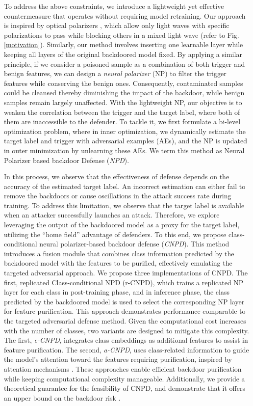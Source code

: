 To address the above constraints, we introduce a lightweight yet effective countermeasure that operates without requiring model retraining. 
Our approach is inspired by optical polarizers \cite{xiong2016optical}, which allow only light waves with specific polarizations to pass while blocking others in a mixed light wave (refer to Fig. \ref{motivation}). 
Similarly, our method involves inserting one learnable layer while keeping all layers of the original backdoored model fixed. By applying a similar principle, if we consider a poisoned sample as a combination of both trigger and benign features, we can design a \textit{neural polarizer} (NP) to filter the trigger features while conserving the benign ones. Consequently, contaminated samples could be cleansed thereby diminishing the impact of the backdoor, while benign samples remain largely unaffected.
With the lightweight NP, our objective is to weaken the correlation between the trigger and the target label, where both of them are inaccessible to the defender. To tackle it, we first formulate a bi-level optimization problem, where in inner optimization, we dynamically estimate the target label and trigger with adversarial examples (AEs), and the NP is updated in outer minimization by unlearning these AEs. We term this method as Neural Polarizer based backdoor Defense (\textit{NPD}).

In this process, we observe that the effectiveness of defense depends on the accuracy of the estimated target label. An incorrect estimation can either fail to remove the backdoors or cause oscillations in the attack success rate during training. To address this limitation, we observe that the target label is available when an attacker successfully launches an attack. Therefore, we explore leveraging the output of the backdoored model as a proxy for the target label, utilizing the ``home field'' advantage of defenders. To this end, we propose class-conditional neural polarizer-based backdoor defense (\textit{CNPD}). This method introduces a fusion module that combines class information predicted by the backdoored model with the features to be purified, effectively emulating the targeted adversarial approach. We propose three implementations of CNPD. The first, replicated Class-conditional NPD (r-CNPD),  which trains a replicated NP layer for each class in post-training phase, and in inference phase, the class predicted by the backdoored model is used to select the corresponding NP layer for feature purification. This approach demonstrates performance comparable to the targeted adversarial defense method.
Given the computational cost increases with the number of classes, two variants are designed to mitigate this complexity. The first, \textit{e-CNPD}, integrates class embeddings as additional features to assist in feature purification. The second, \textit{a-CNPD}, uses class-related information to guide the model's attention toward the features requiring purification, inspired by attention mechanisms \cite{vaswani2017attention}. These approaches enable efficient backdoor purification while keeping computational complexity manageable. Additionally, we provide a theoretical guarantee for the feasibility of CNPD, and demonstrate that it offers an upper bound on the backdoor risk \cite{wei2023shared}.

